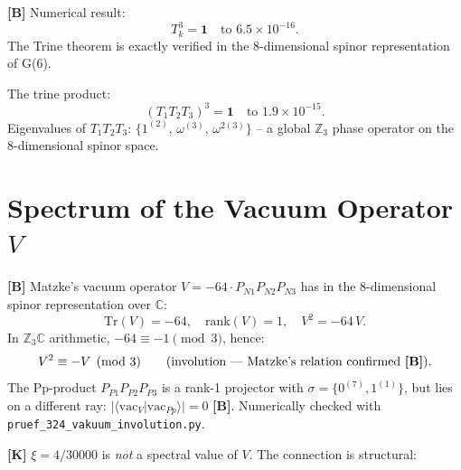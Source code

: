 \textbf{[B]} Numerical result:
\begin{equation}
  T_k^3 = \mathbf{1} \quad \text{to } 6.5\times10^{-16}.
\end{equation}
The Trine theorem is exactly verified in the 8-dimensional spinor
representation of G(6).

The trine product:
\begin{equation}
  (T_1 T_2 T_3)^3 = \mathbf{1} \quad \text{to } 1.9\times10^{-15}.
\end{equation}
Eigenvalues of $T_1 T_2 T_3$: $\{1^{(2)},\, \omega^{(3)},\, \omega^{2(3)}\}$ --
a global $\mathbb{Z}_3$ phase operator on the 8-dimensional spinor space.

\section{Spectrum of the Vacuum Operator $V$}

\textbf{[B]} Matzke's vacuum operator $V = -64\cdot P_{N1}P_{N2}P_{N3}$
has in the 8-dimensional spinor representation over $\mathbb{C}$:
\begin{equation}
  \mathrm{Tr}(V) = -64, \quad \mathrm{rank}(V) = 1, \quad V^2 = -64\,V.
\end{equation}
In $\mathbb{Z}_3\mathbb{C}$ arithmetic, $-64 \equiv -1 \pmod{3}$, hence:
\begin{equation}
  V^2 \equiv -V \pmod{3} \qquad \text{(involution --- Matzke's relation confirmed \textbf{[B]})}.
\end{equation}
The Pp-product $P_{P1}P_{P2}P_{P3}$ is a rank-1 projector with
$\sigma = \{0^{(7)}, 1^{(1)}\}$, but lies on a different ray:
$|\langle\mathrm{vac}_V|\mathrm{vac}_{Pp}\rangle| = 0$ \textbf{[B]}.
Numerically checked with \texttt{pruef\_324\_vakuum\_involution.py}.

\textbf{[K]} $\xi = 4/30000$ is \emph{not} a spectral value of $V$.
The connection is structural:

